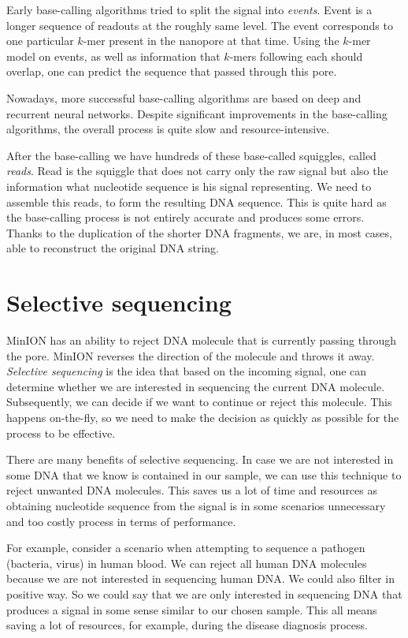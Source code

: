 Early base-calling algorithms tried to split the signal into \textit{events}\cite{david2017nanocall}.
Event is a longer sequence of readouts at the roughly same level. The event corresponds
to one particular $k$-mer present in the nanopore at that time. Using the $k$-mer model on events, as well as information
that $k$-mers following each should overlap, one can predict the sequence that passed through this pore.

Nowadays, more successful base-calling algorithms are based on deep and recurrent neural
networks\cite{wick2019performance}. Despite significant improvements in the base-calling algorithms, the overall
process is quite slow and resource-intensive.

After the base-calling we have hundreds of these base-called squiggles, called \textit{reads}.
Read is the squiggle that does not carry only the raw signal but also the information
what nucleotide sequence is his signal representing. We need to assemble this reads,
to form the resulting DNA sequence. This is quite hard as the base-calling process is not entirely
accurate and produces some errors. Thanks to the duplication of the shorter DNA
fragments, we are, in most cases, able to reconstruct the original DNA string.

\section{Selective sequencing}

MinION has an ability to reject DNA molecule that is currently passing through
the pore. MinION reverses the direction of the molecule and throws it away.
\textit{Selective sequencing} is the idea that based on the incoming signal, one can determine
whether we are interested in sequencing the current DNA molecule. Subsequently, we can decide if we want
to continue or reject this molecule. This happens on-the-fly, so we need to make
the decision as quickly as possible for the process to be effective.

There are many benefits of selective sequencing. In case we are not interested
in some DNA that we know is contained in our sample, we can use this technique to
reject unwanted DNA molecules. This saves us a lot of time and resources as obtaining
nucleotide sequence from the signal is in some scenarios unnecessary and too
costly process in terms of performance.

For example, consider a scenario when attempting to sequence a pathogen (bacteria, virus) in human blood. We can
reject all human DNA molecules because we are not interested in sequencing human
DNA. We could also filter in positive way. So we could say that we are only
interested in sequencing DNA that produces a signal in some sense similar to our
chosen sample. This all means saving a lot of resources, for example, during the disease diagnosis process.

